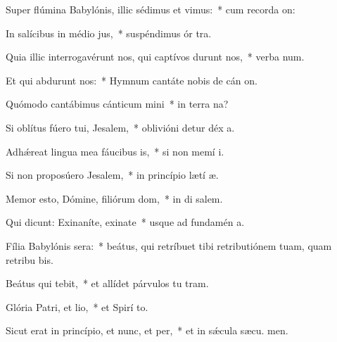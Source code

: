 \item Super flúmina Babylónis, illic sédimus et vimus:~* cum recorda on:
\item In salícibus in médio jus,~* suspéndimus ór tra.
\item Quia illic interrogavérunt nos, qui captívos durunt nos,~* verba num.
\item Et qui abdurunt nos:~* Hymnum cantáte nobis de cán on.
\item Quómodo cantábimus cánticum mini~* in terra na?
\item Si oblítus fúero tui, Jesalem,~* oblivióni detur déx a.
\item Adhǽreat lingua mea fáucibus is,~* si non memí i.
\item Si non proposúero Jesalem,~* in princípio lætí æ.
\item Memor esto, Dómine, filiórum dom,~* in di salem.
\item Qui dicunt: Exinaníte, exinate~* usque ad fundamén  a.
\item Fília Babylónis sera:~* beátus, qui retríbuet tibi retributiónem tuam, quam retribu bis.
\item Beátus qui tebit,~* et allídet párvulos tu  tram.
\item Glória Patri, et lio,~* et Spirí to.
\item Sicut erat in princípio, et nunc, et per,~* et in sǽcula sæcu. men.
